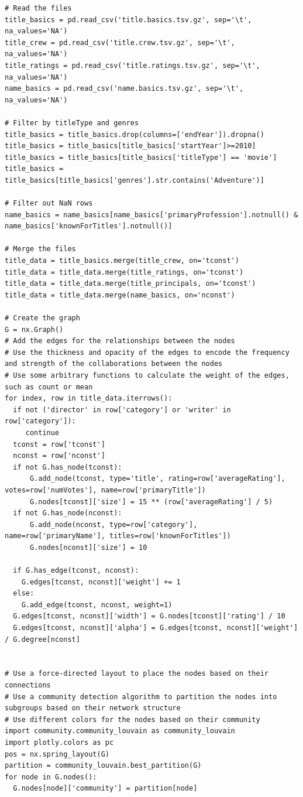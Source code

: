 \begin{tcolorbox}
\begin{verbatim}
# Read the files
title_basics = pd.read_csv('title.basics.tsv.gz', sep='\t', na_values='NA')
title_crew = pd.read_csv('title.crew.tsv.gz', sep='\t', na_values='NA')
title_ratings = pd.read_csv('title.ratings.tsv.gz', sep='\t', na_values='NA')
name_basics = pd.read_csv('name.basics.tsv.gz', sep='\t', na_values='NA')

# Filter by titleType and genres
title_basics = title_basics.drop(columns=['endYear']).dropna()
title_basics = title_basics[title_basics['startYear']>=2010]
title_basics = title_basics[title_basics['titleType'] == 'movie']
title_basics = title_basics[title_basics['genres'].str.contains('Adventure')]

# Filter out NaN rows
name_basics = name_basics[name_basics['primaryProfession'].notnull() & name_basics['knownForTitles'].notnull()]

# Merge the files
title_data = title_basics.merge(title_crew, on='tconst')
title_data = title_data.merge(title_ratings, on='tconst')
title_data = title_data.merge(title_principals, on='tconst')
title_data = title_data.merge(name_basics, on='nconst')

# Create the graph
G = nx.Graph()
# Add the edges for the relationships between the nodes
# Use the thickness and opacity of the edges to encode the frequency and strength of the collaborations between the nodes
# Use some arbitrary functions to calculate the weight of the edges, such as count or mean
for index, row in title_data.iterrows():
  if not ('director' in row['category'] or 'writer' in row['category']):
     continue
  tconst = row['tconst']
  nconst = row['nconst']
  if not G.has_node(tconst):
      G.add_node(tconst, type='title', rating=row['averageRating'], votes=row['numVotes'], name=row['primaryTitle'])
      G.nodes[tconst]['size'] = 15 ** (row['averageRating'] / 5)
  if not G.has_node(nconst):
      G.add_node(nconst, type=row['category'], name=row['primaryName'], titles=row['knownForTitles'])
      G.nodes[nconst]['size'] = 10

  if G.has_edge(tconst, nconst):
    G.edges[tconst, nconst]['weight'] += 1
  else:
    G.add_edge(tconst, nconst, weight=1)
  G.edges[tconst, nconst]['width'] = G.nodes[tconst]['rating'] / 10
  G.edges[tconst, nconst]['alpha'] = G.edges[tconst, nconst]['weight'] / G.degree[nconst]


# Use a force-directed layout to place the nodes based on their connections
# Use a community detection algorithm to partition the nodes into subgroups based on their network structure
# Use different colors for the nodes based on their community
import community.community_louvain as community_louvain
import plotly.colors as pc
pos = nx.spring_layout(G)
partition = community_louvain.best_partition(G)
for node in G.nodes():
  G.nodes[node]['community'] = partition[node]


\end{verbatim}
\end{tcolorbox}
